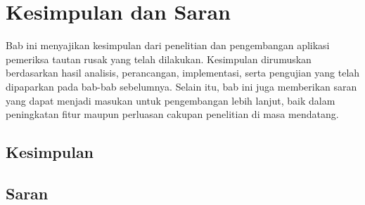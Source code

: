\chapter{Kesimpulan dan Saran}
\label{chap:kesimpulan-dan-saran}

Bab ini menyajikan kesimpulan dari penelitian dan pengembangan aplikasi pemeriksa tautan rusak yang telah dilakukan. Kesimpulan dirumuskan berdasarkan hasil analisis, perancangan, implementasi, serta pengujian yang telah dipaparkan pada bab-bab sebelumnya. Selain itu, bab ini juga memberikan saran yang dapat menjadi masukan untuk pengembangan lebih lanjut, baik dalam peningkatan fitur maupun perluasan cakupan penelitian di masa mendatang.


\section{Kesimpulan}
\label{sec:06-kesimpulan}



\section{Saran}
\label{sec:06-saran}
